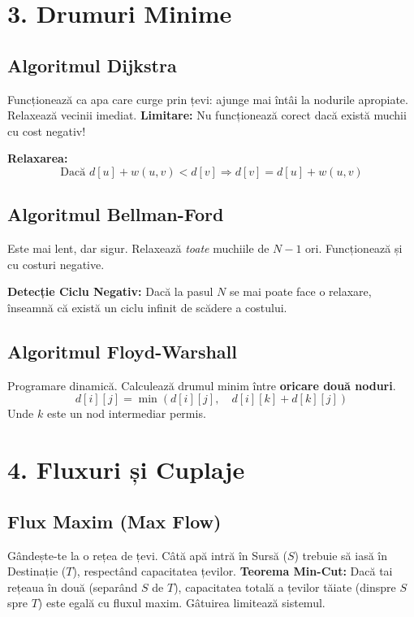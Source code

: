 \documentclass[a4paper,10pt]{article}
\begin{document}
\section{3. Drumuri Minime}

\subsection{Algoritmul Dijkstra}
\begin{intuition}
Funcționează ca apa care curge prin țevi: ajunge mai întâi la nodurile apropiate. Relaxează vecinii imediat.
\textbf{Limitare:} Nu funcționează corect dacă există muchii cu cost negativ!
\end{intuition}
\textbf{Relaxarea:} 
$$ \text{Dacă } d[u] + w(u,v) < d[v] \Rightarrow d[v] = d[u] + w(u,v) $$

\subsection{Algoritmul Bellman-Ford}
\begin{intuition}
Este mai lent, dar sigur. Relaxează \textit{toate} muchiile de $N-1$ ori.
Funcționează și cu costuri negative.
\end{intuition}
\textbf{Detecție Ciclu Negativ:} Dacă la pasul $N$ se mai poate face o relaxare, înseamnă că există un ciclu infinit de scădere a costului.

\subsection{Algoritmul Floyd-Warshall}
Programare dinamică. Calculează drumul minim între \textbf{oricare două noduri}.
$$ d[i][j] = \min(d[i][j], \quad d[i][k] + d[k][j]) $$
Unde $k$ este un nod intermediar permis.

\section{4. Fluxuri și Cuplaje}

\subsection{Flux Maxim (Max Flow)}
\begin{intuition}
Gândește-te la o rețea de țevi. Câtă apă intră în Sursă ($S$) trebuie să iasă în Destinație ($T$), respectând capacitatea țevilor.
\textbf{Teorema Min-Cut:} Dacă tai rețeaua în două (separând $S$ de $T$), capacitatea totală a țevilor tăiate (dinspre $S$ spre $T$) este egală cu fluxul maxim. Gâtuirea limitează sistemul.
\end{intuition}
\end{document}
